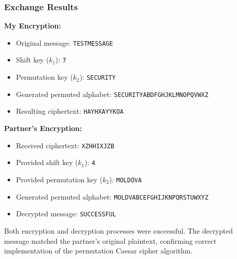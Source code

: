 \documentclass[a4paper,12pt]{article}
\begin{document}
\subsubsection{Exchange Results}
\label{sec:orgf91239b}
\textbf{My Encryption:}
\begin{itemize}
\item Original message: \texttt{TESTMESSAGE}
\item Shift key (\(k_{1}\)): \texttt{7}
\item Permutation key (\(k_{2}\)): \texttt{SECURITY}
\item Generated permuted alphabet: \texttt{SECURITYABDFGHJKLMNOPQVWXZ}
\item Resulting ciphertext: \texttt{HAYHXAYYKOA}
\end{itemize}
\textbf{Partner's Encryption:}
\begin{itemize}
\item Received ciphertext: \texttt{XZHHIXJZB}
\item Provided shift key (\(k_{1}\)): \texttt{4}
\item Provided permutation key (\(k_{2}\)): \texttt{MOLDOVA}
\item Generated permuted alphabet: \texttt{MOLDVABCEFGHIJKNPQRSTUWXYZ}
\item Decrypted message: \texttt{SUCCESSFUL}
\end{itemize}
Both encryption and decryption processes were successful. The decrypted message matched the partner's original plaintext, confirming correct implementation of the permutation Caesar cipher algorithm.
\end{document}
